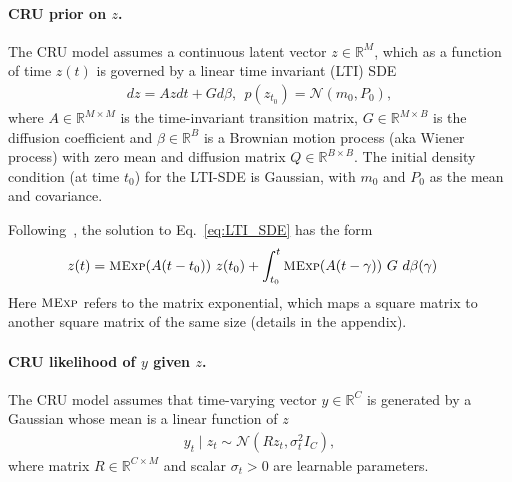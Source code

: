 \paragraph{CRU prior on $z$.}
The CRU model assumes a continuous latent vector $z\in \mathbb{R}^M$, which as a function of time $z(t)$ is governed by a linear time invariant (LTI) SDE
\begin{align}
    dz = Azdt + Gd\beta, ~~ p(z_{t_0})=\mathcal{N}(m_0, P_0),
    \label{eq:LTI_SDE}
\end{align}
where $A\in\mathbb{R}^{M\times M}$ is the time-invariant transition matrix, $G\in\mathbb{R}^{M\times B}$ is the diffusion coefficient and $\beta \in \mathbb{R}^B$ is a Brownian motion process (aka Wiener process) with zero mean and diffusion matrix $Q\in \mathbb{R}^{B\times B}$. The initial density condition (at time $t_0$) for the LTI-SDE is Gaussian, with $m_0$ and $P_0$ as the mean and covariance.

Following~\citet{sarkka2019applied}, the solution to Eq.~\eqref{eq:LTI_SDE} has the form
\begin{align}
    \label{eq:LTI_SDE_soln}
    z(t) &= {\small \textsc{MExp}}(A(t-t_0))~z(t_0) + \int_{t_0}^t {\small \textsc{MExp}}(A(t-\gamma))~G ~d\beta(\gamma) \notag
\end{align}
Here ${\small \textsc{MExp}}$ refers to the matrix exponential, which maps a square matrix to another square matrix of the same size (details in the appendix). 

\newcommand{\RRR}{R}

\paragraph{CRU likelihood of $y$ given $z$.}
The CRU model assumes that time-varying vector $y \in \mathbb{R}^C$ is generated by a Gaussian whose mean is a linear function of $z$
\begin{align*}
    y_t \mid z_t \sim \mathcal{N}(\RRR z_t, \sigma_t^2 I_C),
\end{align*}
where matrix $\RRR \in \mathbb{R}^{C \times M}$ and scalar $\sigma_t > 0$ are learnable parameters.

